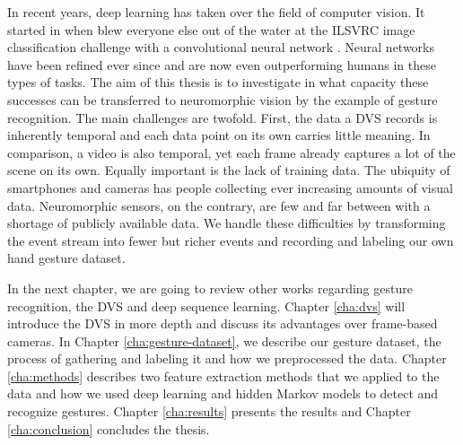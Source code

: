 In recent years, deep learning has taken over the field of computer vision. It
started in \citeyear{alexnet} when \citeauthor{alexnet} blew everyone else out
of the water at the ILSVRC image classification challenge with a convolutional
neural network \cite{alexnet}. Neural networks have been refined ever since and
are now even outperforming humans in these types of tasks. The aim of this
thesis is to investigate in what capacity these successes can be transferred to
neuromorphic vision by the example of gesture recognition. The main challenges
are twofold. First, the data a DVS records is inherently temporal and each data
point on its own carries little meaning. In comparison, a video is also
temporal, yet each frame already captures a lot of the scene on its own. Equally
important is the lack of training data. The ubiquity of smartphones and cameras
has people collecting ever increasing amounts of visual data. Neuromorphic
sensors, on the contrary, are few and far between with a shortage of publicly
available data. We handle these difficulties by transforming the event stream
into fewer but richer events and recording and labeling our own hand gesture
dataset.

In the next chapter, we are going to review other works regarding gesture
recognition, the DVS and deep sequence learning. Chapter \ref{cha:dvs} will
introduce the DVS in more depth and discuss its advantages over frame-based
cameras. In Chapter \ref{cha:gesture-dataset}, we describe our gesture dataset,
the process of gathering and labeling it and how we preprocessed the data.
Chapter \ref{cha:methods} describes two feature extraction methods that we
applied to the data and how we used deep learning and hidden Markov models to
detect and recognize gestures. Chapter \ref{cha:results} presents the results
and Chapter \ref{cha:conclusion} concludes the thesis.
